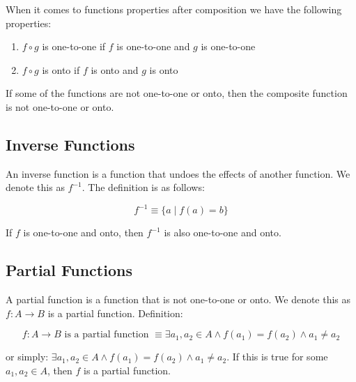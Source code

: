 \documentclass[11pt]{article}
\begin{document}
When it comes to functions properties after composition we have the following properties:
\begin{enumerate}
\item \(f \circ g\) is one-to-one if \(f\) is one-to-one and \(g\) is one-to-one
\item \(f \circ g\) is onto if \(f\) is onto and \(g\) is onto
\end{enumerate}

If some of the functions are not one-to-one or onto, then the composite function is not one-to-one or onto.


\subsection{Inverse Functions}
\label{sec:org7ae0507}
An inverse function is a function that undoes the effects of another function. We denote this as \(f^{-1}\). The definition is as follows:

\[
f^{-1} \equiv \{a \mid f(a) = b\}
\]

If \(f\) is one-to-one and onto, then \(f^{-1}\) is also one-to-one and onto.

\subsection{Partial Functions}
\label{sec:orga0c9333}
A partial function is a function that is not one-to-one or onto. We denote this as \(f: A \rightarrow B\) is a partial function. Definition:

\[
f: A \rightarrow B \text{ is a partial function } \equiv \exists a_1, a_2 \in A \land f(a_1) = f(a_2) \land a_1 \neq a_2
\]

or simply: \(\exists a_1, a_2 \in A \land f(a_1) = f(a_2) \land a_1 \neq a_2\). If this is true for some \(a_1, a_2 \in A\), then \(f\) is a partial function.
\end{document}
